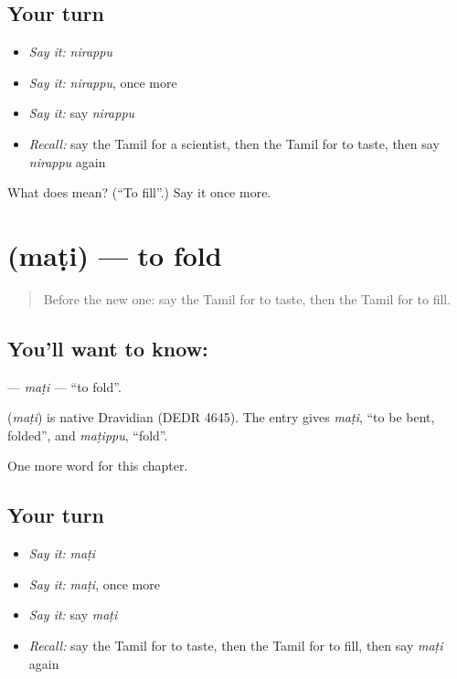 \subsection*{Your turn}
\begin{itemize}
\raggedright
  \item \emph{Say it:} \emph{nirappu}
  \item \emph{Say it:} \emph{nirappu}, once more
  \item \emph{Say it:} say \emph{nirappu}
  \item \emph{Recall:} say the Tamil for a scientist, then the Tamil for to taste, then say \emph{nirappu} again
\end{itemize}

\begin{tcolorbox}[breakable,colback=teal!4,colframe=teal!35!black,title={Before you move on}]
What does  mean? (\textquotedblleft{}To fill\textquotedblright{}.) Say it once more.
\end{tcolorbox}
\section[\texorpdfstring{\ta{மடி} (maṭi)}{மடி (maṭi)}]{ (maṭi) — to fold}

\label{lesson:TA-C225-mati2}



\begin{quote}
Before the new one: say the Tamil for to taste, then the Tamil for to fill.
\end{quote}

\subsection*{You'll want to know: }
\textbf{} — \emph{maṭi} — \textquotedblleft{}to fold\textquotedblright{}.

\begin{cousinweb}
\textbf{} (\emph{maṭi}) is native Dravidian (DEDR 4645). The entry gives \emph{maṭi}, \textquotedblleft{}to be bent, folded\textquotedblright{}, and \emph{maṭippu}, \textquotedblleft{}fold\textquotedblright{}.
\end{cousinweb}

\begin{grammarlens}[title={What you've built}]
One more word for this chapter.
\end{grammarlens}

\subsection*{Your turn}
\begin{itemize}
\raggedright
  \item \emph{Say it:} \emph{maṭi}
  \item \emph{Say it:} \emph{maṭi}, once more
  \item \emph{Say it:} say \emph{maṭi}
  \item \emph{Recall:} say the Tamil for to taste, then the Tamil for to fill, then say \emph{maṭi} again
\end{itemize}

